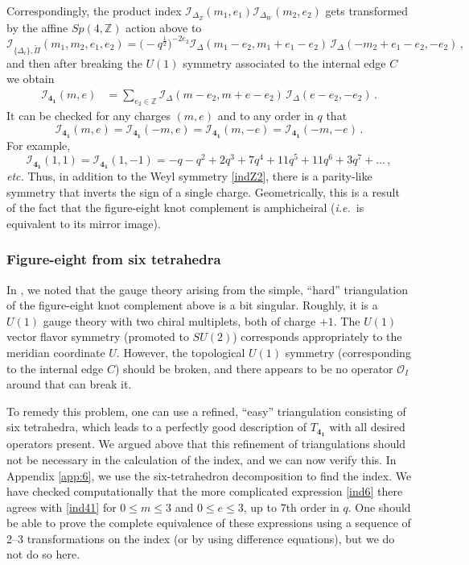 \documentclass[11pt,letterpaper]{article}
\numberwithin{equation}{section}
\newcommand{\be}{\begin{equation}}
\newcommand{\ee}{\end{equation}}
\newcommand{\mb}{\mathbf}
\newcommand{\ie}{\emph{i.e.}}
\newcommand{\Z}{{\mathbb Z}}
\newcommand{\CI}{\mathcal{I}}
\newcommand{\CO}{\mathcal{O}}
\begin{document}
Correspondingly, the product index $\CI_{\Delta_Z}(m_1,e_1)\CI_{\Delta_W}(m_2,e_2)$ gets transformed by the affine $Sp(4,\Z)$ action above to
%
\be \CI_{\{\Delta_i\},\tilde\Pi}(m_1,m_2,e_1,e_2) = \big(-q^{\frac12}\big)^{-2e_2}\CI_\Delta(m_1-e_2,m_1+e_1-e_2)\,\CI_\Delta(-m_2+e_1-e_2,-e_2)\,, \ee
%
and then after breaking the $U(1)$ symmetry associated to the internal edge $C$ we obtain
%
\begin{align} \CI_{\mb{4_1}}(m,e) &= \sum_{e_2\in \Z}\CI_\Delta(m-e_2,m+e-e_2)\,\CI_\Delta(e-e_2,-e_2)\,. \label{ind41}
\end{align}
%
It can be checked for any charges $(m,e)$ and to any order in $q$ that
%
\be \CI_{\mb{4_1}}(m,e) = \CI_{\mb{4_1}}(-m,e) = \CI_{\mb{4_1}}(m,-e) = \CI_{\mb{4_1}}(-m,-e)\,.\ee
%
For example,
%
\be \CI_{\mb{4_1}}(1,1)=\CI_{\mb{4_1}}(1,-1)= -q-q^2+2q^3+7q^4+11q^5+11q^6+3q^7+\dots\,, \ee
%
{\it etc.}
Thus, in addition to the Weyl symmetry \eqref{indZ2}, there is a parity-like symmetry that inverts the sign of a single charge. Geometrically, this is a result of the fact that the figure-eight knot complement is amphicheiral (\ie\ is equivalent to its mirror image).



\subsubsection*{Figure-eight from six tetrahedra}

In \cite{DGG}, we noted that the gauge theory arising from the simple, ``hard'' triangulation of the figure-eight knot complement above is a bit singular. Roughly, it is a $U(1)$ gauge theory with two chiral multiplets, both of charge $+1$. The $U(1)$ vector flavor symmetry (promoted to $SU(2)$) corresponds appropriately to the meridian coordinate $U$. However, the topological $U(1)$ symmetry (corresponding to the internal edge $C$) should be broken, and there appears to be no operator $\CO_I$ around that can break it.

To remedy this problem, one can use a refined, ``easy'' triangulation consisting of six tetrahedra, which leads to a perfectly good description of $T_{\mb{4_1}}$ with all desired operators present. We argued above that this refinement of triangulations should not be necessary in the calculation of the index, and we can now verify this. In Appendix \ref{app:6}, we use the six-tetrahedron decomposition to find the index. We have checked computationally that the more complicated expression \eqref{ind6} there agrees with \eqref{ind41} for $0\leq m \leq 3$ and $0\leq e\leq 3$, up to $7$th order in $q$. One should be able to prove the complete equivalence of these expressions using a sequence of 2--3 transformations on the index (or by using difference equations), but we do not do so here.
\end{document}
